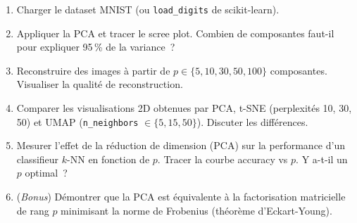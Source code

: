 \begin{exercice}
\begin{enumerate}
  \item Charger le dataset MNIST (ou \texttt{load\_digits} de scikit-learn).
  \item Appliquer la PCA et tracer le scree plot. Combien de composantes
    faut-il pour expliquer 95\,\% de la variance~?
  \item Reconstruire des images \`a partir de $p \in \{5, 10, 30, 50, 100\}$
    composantes. Visualiser la qualit\'e de reconstruction.
  \item Comparer les visualisations 2D obtenues par PCA, t-SNE
    (perplexit\'es 10, 30, 50) et UMAP (\texttt{n\_neighbors} $\in
    \{5, 15, 50\}$). Discuter les diff\'erences.
  \item Mesurer l'effet de la r\'eduction de dimension (PCA) sur la performance
    d'un classifieur $k$-NN en fonction de $p$. Tracer la courbe accuracy vs
    $p$. Y a-t-il un $p$ optimal~?
  \item (\emph{Bonus}) D\'emontrer que la PCA est \'equivalente \`a la
    factorisation matricielle de rang $p$ minimisant la norme de Frobenius
    (th\'eor\`eme d'Eckart-Young).
\end{enumerate}
\end{exercice}

